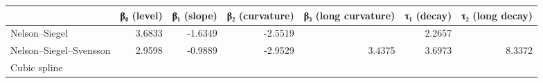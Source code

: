\begin{tabular}{lrrrrrr}
\toprule
 & β₀ (level) & β₁ (slope) & β₂ (curvature) & β₃ (long curvature) & τ₁ (decay) & τ₂ (long decay) \\
\midrule
Nelson–Siegel & 3.6833 & -1.6349 & -2.5519 &  & 2.2657 &  \\
Nelson–Siegel–Svensson & 2.9598 & -0.9889 & -2.9529 & 3.4375 & 3.6973 & 8.3372 \\
Cubic spline &  &  &  &  &  &  \\
\bottomrule
\end{tabular}
